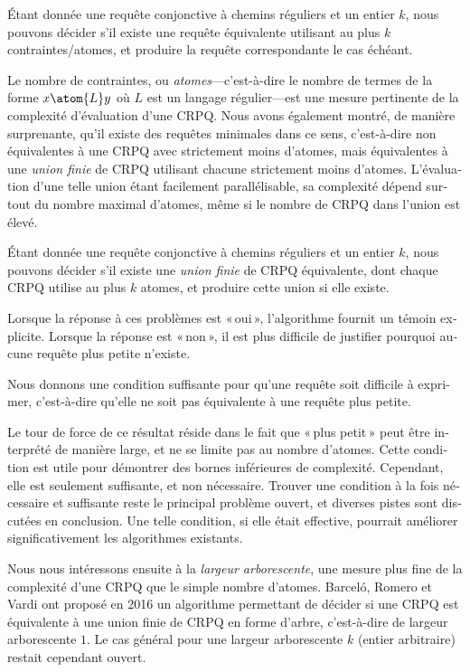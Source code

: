 \begin{french}
\begin{contribution}
	Étant donnée une requête conjonctive à chemins réguliers et un entier $k$, nous pouvons décider
	s'il existe une requête équivalente utilisant au plus $k$ contraintes/atomes, et produire
	la requête correspondante le cas échéant.
\end{contribution}

Le nombre de contraintes, ou \emph{atomes}---c'est-à-dire le nombre de termes de la
forme $x \atom{L} y$ où $L$ est un langage régulier---est une mesure pertinente de la complexité
d'évaluation d'une CRPQ. 
Nous avons également montré, de manière surprenante, qu'il existe des requêtes minimales dans 
ce sens, c'est-à-dire non équivalentes à une CRPQ avec strictement moins 
d'atomes, mais équivalentes à une \emph{union finie} de CRPQ utilisant chacune 
strictement moins d'atomes. L'évaluation d'une telle union étant facilement 
parallélisable, sa complexité dépend surtout du nombre maximal d'atomes, même si le 
nombre de CRPQ dans l'union est élevé.

\begin{contribution}
	Étant donnée une requête conjonctive à chemins réguliers et un entier $k$, nous pouvons décider
	s'il existe une \emph{union finie} de CRPQ équivalente, dont chaque CRPQ utilise au plus $k$ atomes, et produire cette union si elle existe.
\end{contribution}

Lorsque la réponse à ces problèmes est « oui », l'algorithme fournit un témoin explicite.
Lorsque la réponse est « non », il est plus difficile de justifier pourquoi aucune requête plus petite n'existe.
\begin{contribution}
	Nous donnons une condition suffisante pour qu'une requête soit difficile à exprimer, 
	c'est-à-dire qu'elle ne soit pas équivalente à une requête plus petite.
\end{contribution}

Le tour de force de ce résultat réside dans le fait que « plus petit » peut être interprété de manière large, et ne se limite pas au nombre d'atomes. Cette condition est utile pour démontrer des bornes inférieures de complexité.
Cependant, elle est seulement suffisante, et non nécessaire. Trouver une condition à la fois nécessaire et suffisante reste le principal problème ouvert, et diverses pistes sont discutées en conclusion. Une telle condition, si elle était effective, pourrait améliorer significativement les algorithmes existants.

Nous nous intéressons ensuite à la \emph{largeur arborescente}, une mesure plus fine de la complexité d'une CRPQ que le simple nombre d'atomes. Barceló, Romero et Vardi ont proposé en 2016 un algorithme permettant de décider si une CRPQ est équivalente à une union finie
de CRPQ en forme d'arbre, c'est-à-dire de largeur arborescente $1$.
Le cas général pour une largeur arborescente $k$ (entier arbitraire) restait cependant ouvert.


\end{french}
